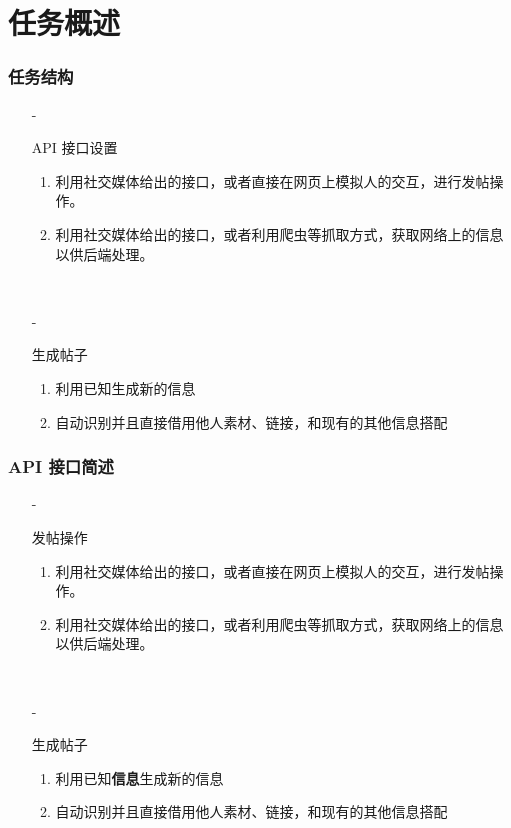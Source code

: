 \documentclass[../Postbot.tex]{subfiles}
\begin{document}
    \section*{任务概述}
    \begin{frame}
        \frametitle{任务结构}
        \begin{itemize}
            \item[-]{
                API 接口设置
                \begin{enumerate}
                    \item 利用社交媒体给出的接口，或者直接在网页上模拟人的交互，进行发帖操作。
                    \item 利用社交媒体给出的接口，或者利用爬虫等抓取方式，获取网络上的信息以供后端处理。
                \end{enumerate}
                \hspace*{\fill}\\
                }
            \item[-]{
                生成帖子
                \begin{enumerate}
                    \item 利用已知生成新的信息
                    \item 自动识别并且直接借用他人素材、链接，和现有的其他信息搭配
                \end{enumerate}
                } 
        \end{itemize}
    \end{frame}


    \begin{frame}
        \frametitle{API 接口简述}
        \begin{itemize}
            \item[-]{
                发帖操作
                \begin{enumerate}
                    \item 利用社交媒体给出的接口，或者直接在网页上模拟人的交互，进行发帖操作。
                    \item 利用社交媒体给出的接口，或者利用爬虫等抓取方式，获取网络上的信息以供后端处理。
                \end{enumerate}
                \hspace*{\fill}\\
                }
            \item[-]{
                生成帖子
                \begin{enumerate}
                    \item 利用已知\textbf{信息}生成新的信息
                    \item 自动识别并且直接借用他人素材、链接，和现有的其他信息搭配
                \end{enumerate}
                } 
        \end{itemize}
    \end{frame}
\end{document}
